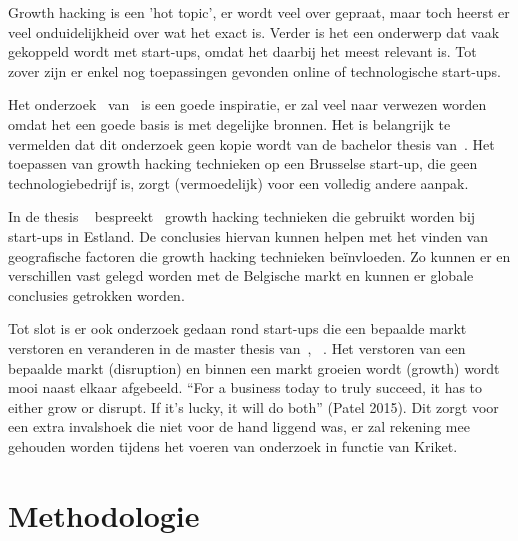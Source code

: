 Growth hacking is een 'hot topic', er wordt veel over gepraat, maar toch heerst er veel onduidelijkheid over wat het exact is. Verder is het een onderwerp dat vaak gekoppeld wordt met start-ups, omdat het daarbij het meest relevant is. Tot zover zijn er enkel nog toepassingen gevonden online of technologische start-ups.

Het onderzoek~ van~\textcite{Lee2016} is een goede inspiratie, er zal veel naar verwezen worden omdat het een goede basis is met degelijke bronnen. Het is belangrijk te vermelden dat dit onderzoek geen kopie wordt van de bachelor thesis van~\textcite{Lee2016}. Het toepassen van growth hacking technieken op een Brusselse start-up, die geen technologiebedrijf is, zorgt (vermoedelijk) voor een volledig andere aanpak. 

In de thesis ~ bespreekt~\textcite{Vunk2017} growth hacking technieken die gebruikt worden bij start-ups in Estland. De conclusies hiervan kunnen helpen met het vinden van geografische factoren die growth hacking technieken beïnvloeden. Zo kunnen er en verschillen vast gelegd worden met de Belgische markt en kunnen er globale conclusies getrokken worden.

Tot slot is er ook onderzoek gedaan rond start-ups die een bepaalde markt verstoren en veranderen in de master thesis van~\textcite{Bergendal2017}, ~. Het verstoren van een bepaalde markt (disruption) en binnen een markt groeien wordt (growth) wordt mooi naast elkaar afgebeeld. “For a business today to truly succeed, it has to either grow or disrupt. If it’s lucky, it will do both” (Patel 2015). Dit zorgt voor een extra invalshoek die niet voor de hand liggend was, er zal rekening mee gehouden worden tijdens het voeren van onderzoek in functie van Kriket. 


\section{Methodologie}
\label{sec:methodologie}

